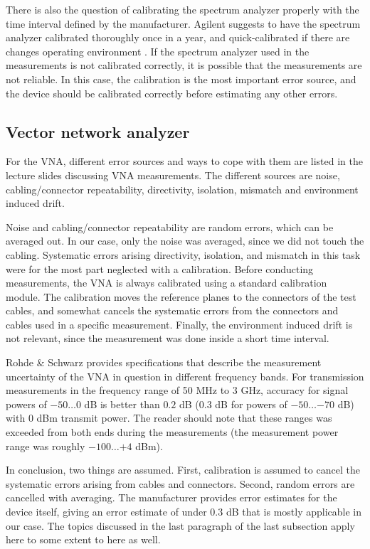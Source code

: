 \documentclass[a4paper, 12pt]{article}
\begin{document}
There is also the question of calibrating the spectrum analyzer properly with 
the time interval defined by the manufacturer. Agilent suggests to have the spectrum 
analyzer calibrated thoroughly once in a year, and quick-calibrated if there are 
changes operating environment \cite{sa2}. If the spectrum analyzer used in the 
measurements is not calibrated correctly, it is possible that the measurements are 
not reliable. In this case, the calibration is the most important error source, and 
the device should be calibrated correctly before estimating any other errors.


\subsection{Vector network analyzer}

For the VNA, different error sources and ways to cope with them are listed in the 
lecture slides discussing VNA measurements. The different sources are noise, 
cabling/connector repeatability, directivity, isolation, mismatch and environment 
induced drift. 

Noise and cabling/connector repeatability are random errors, which can be averaged 
out. In our case, only the noise was averaged, since we did not touch the cabling. 
Systematic errors arising directivity, isolation, and mismatch in this task were
for the most part neglected with a calibration. Before conducting measurements, 
the VNA is always calibrated using a standard calibration module. The calibration 
moves the reference planes to the connectors of the test cables, and somewhat 
cancels the systematic errors from the connectors and cables used in a specific 
measurement. Finally, the environment induced drift is not relevant, since the 
measurement was done inside a short time interval.

Rohde \& Schwarz provides specifications that describe the measurement uncertainty 
of the VNA in question in different frequency bands. For transmission measurements 
in the frequency range of 50 MHz to 3 GHz, accuracy for signal powers of $-50 \ldots 0$ 
dB is better than $0.2$ dB ($0.3$ dB for powers of $-50 \ldots {-70}$ dB) with 0 dBm 
transmit power. \cite{vna} The reader should note that these ranges was exceeded 
from both ends during the measurements (the measurement power range was roughly 
$-100 \ldots {+4}$ dBm). 

In conclusion, two things are assumed. First, calibration is assumed to cancel the 
systematic errors arising from cables and connectors. Second, random errors are 
cancelled with averaging. The manufacturer provides error estimates for the device 
itself, giving an error estimate of under $0.3$ dB that is mostly applicable in 
our case. The topics discussed in the last paragraph of the last subsection apply 
here to some extent to here as well.
\end{document}
